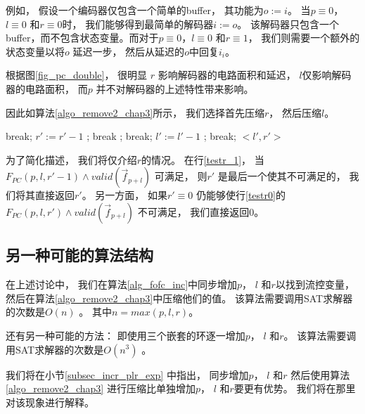 例如，
假设一个编码器仅包含一个简单的buffer，
其功能为$o:=i$。
当$p\equiv 0$，$l\equiv 0$ 和$r\equiv 0$时，
我们能够得到最简单的解码器$i:=o$。
该解码器只包含一个buffer，而不包含状态变量。而对于$p\equiv 0$，$l\equiv 0$ 和$r\equiv 1$，
我们则需要一个额外的状态变量以将$o$ 延迟一步，
然后从延迟的$o$中回复$i_i$。

根据图\ref{fig_pc_double}，
很明显
$r$ 影响解码器的电路面积和延迟，
$l$仅影响解码器的电路面积，
而$p$ 并不对解码器的上述特性带来影响。

因此如算法\ref{algo_remove2_chap3}所示，
我们选择首先压缩$r$，
然后压缩$l$。

\begin{algorithm}[t]
\caption{$RemoveRedundancy(p,l,r)$}
\label{algo_remove2_chap3}
\begin{algorithmic}[1]
\label{testr_1}
    \STATE break;
\label{testr0}
    \STATE $r':=r'-1$ ;
    \STATE break ;
  \ENDIF
\ENDFOR
{}
    \STATE break;
    \STATE $l':=l'-1$ ;
    \STATE break;
  \ENDIF
\ENDFOR
\RETURN $<l',r'>$
\end{algorithmic}
\end{algorithm}

为了简化描述，
我们将仅介绍$r$的情况。
在行\ref{testr_1}，
当$F_{PC}(p,l,r'-1)\wedge valid(\vec{f}_{p+l})$ 可满足，
则$r'$ 是最后一个使其不可满足的，
我们将其直接返回$r'$。
另一方面，
如果$r'\equiv 0$ 仍能够使行\ref{testr0}的$F_{PC}(p,l,r')\wedge valid(\vec{f}_{p+l})$ 不可满足，
我们直接返回0。

\subsection{另一种可能的算法结构}\label{alter}

在上述讨论中，
我们在算法\ref{alg_fofc_inc}中同步增加$p$， $l$ 和$r$以找到流控变量，
然后在算法\ref{algo_remove2_chap3}中压缩他们的值。
该算法需要调用SAT求解器的次数是$O(n)$ 。
其中$n=max(p,l,r)$。

还有另一种可能的方法：
即使用三个嵌套的环逐一增加$p$， $l$ 和$r$。
该算法需要调用SAT求解器的次数是$O(n^3)$ 。


我们将在小节\ref{subsec_incr_plr_exp} 中指出，
同步增加$p$， $l$ 和$r$ 然后使用算法\ref{algo_remove2_chap3} 进行压缩比单独增加$p$， $l$ 和$r$要更有优势。
我们将在那里对该现象进行解释。





